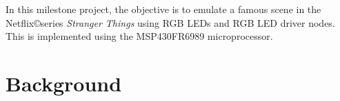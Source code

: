 \documentclass{hitec}
\begin{document}
\noindent In this milestone project, the objective is to emulate a famous scene in the Netflix\copyright series \textit{Stranger Things} using RGB LEDs and RGB LED driver nodes. This is implemented using the MSP430FR6989 microprocessor.

\section{Background}

\end{document}
